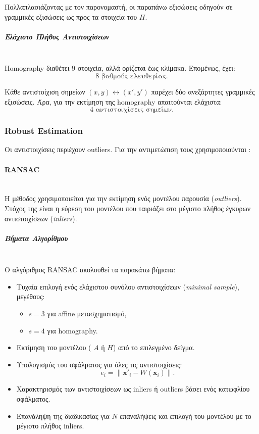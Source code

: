 \documentclass[12pt]{article}
\begin{document}
Πολλαπλασιάζοντας με τον παρονομαστή, οι παραπάνω εξισώσεις οδηγούν σε γραμμικές εξισώσεις ως προς τα στοιχεία του \(H\).

\subparagraph{Ελάχιστο Πλήθος Αντιστοιχίσεων}
\mbox{}\\
Homography διαθέτει 9 στοιχεία, αλλά ορίζεται έως κλίμακα. Επομένως, έχει:
\[
8 \text{ βαθμούς ελευθερίας}.
\]

Κάθε αντιστοίχιση σημείων \((x,y) \leftrightarrow (x',y')\) παρέχει δύο ανεξάρτητες γραμμικές εξισώσεις. Άρα, για την εκτίμηση της homography απαιτούνται ελάχιστα:
\[
4 \text{ αντιστοιχίσεις σημείων}.
\]



\subsubsection{Robust Estimation}
Οι αντιστοιχίσεις περιέχουν outliers. Για την αντιμετώπιση τους χρησιμοποιούνται :
\paragraph{RANSAC}
\mbox{}\\
Η μέθοδος χρησιμοποιείται για την εκτίμηση ενός μοντέλου παρουσία (\textit{outliers}). Στόχος της είναι η εύρεση του μοντέλου που ταιριάζει στο 
μέγιστο πλήθος έγκυρων αντιστοιχίσεων (\textit{inliers}).

\subparagraph{Βήματα Αλγορίθμου}
\mbox{}\\
Ο αλγόριθμος RANSAC ακολουθεί τα παρακάτω βήματα:
\begin{itemize}
    \item Τυχαία επιλογή ενός ελάχιστου συνόλου αντιστοιχίσεων (\textit{minimal sample}), μεγέθους:
    \begin{itemize}
        \item \(s = 3\) για affine μετασχηματισμό,
        \item \(s = 4\) για homography.
    \end{itemize}

    \item Εκτίμηση του μοντέλου ( \(A\) ή \(H\)) από το επιλεγμένο δείγμα.

    \item Υπολογισμός του σφάλματος για όλες τις αντιστοιχίσεις:
    \[
    e_i = \left\| \mathbf{x}'_i - W(\mathbf{x}_i) \right\|.
    \]

    \item Χαρακτηρισμός των αντιστοιχίσεων ως inliers ή outliers βάσει ενός κατωφλίου σφάλματος.

    \item Επανάληψη της διαδικασίας για \(N\) επαναλήψεις και επιλογή του μοντέλου με το μέγιστο πλήθος inliers.
\end{itemize}
\end{document}
